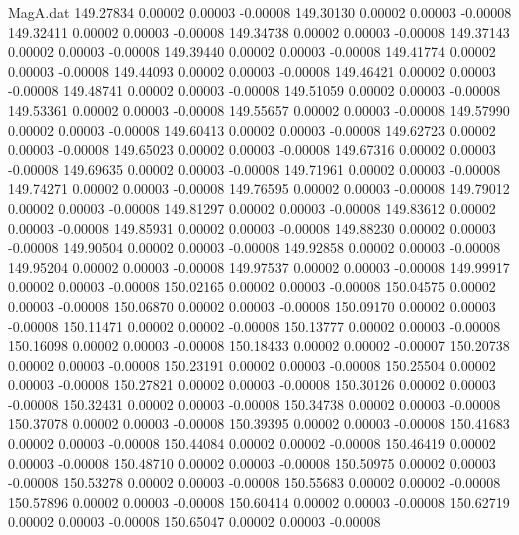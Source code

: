 \begin{filecontents}{MagA.dat}
 149.27834    0.00002    0.00003   -0.00008
 149.30130    0.00002    0.00003   -0.00008
 149.32411    0.00002    0.00003   -0.00008
 149.34738    0.00002    0.00003   -0.00008
 149.37143    0.00002    0.00003   -0.00008
 149.39440    0.00002    0.00003   -0.00008
 149.41774    0.00002    0.00003   -0.00008
 149.44093    0.00002    0.00003   -0.00008
 149.46421    0.00002    0.00003   -0.00008
 149.48741    0.00002    0.00003   -0.00008
 149.51059    0.00002    0.00003   -0.00008
 149.53361    0.00002    0.00003   -0.00008
 149.55657    0.00002    0.00003   -0.00008
 149.57990    0.00002    0.00003   -0.00008
 149.60413    0.00002    0.00003   -0.00008
 149.62723    0.00002    0.00003   -0.00008
 149.65023    0.00002    0.00003   -0.00008
 149.67316    0.00002    0.00003   -0.00008
 149.69635    0.00002    0.00003   -0.00008
 149.71961    0.00002    0.00003   -0.00008
 149.74271    0.00002    0.00003   -0.00008
 149.76595    0.00002    0.00003   -0.00008
 149.79012    0.00002    0.00003   -0.00008
 149.81297    0.00002    0.00003   -0.00008
 149.83612    0.00002    0.00003   -0.00008
 149.85931    0.00002    0.00003   -0.00008
 149.88230    0.00002    0.00003   -0.00008
 149.90504    0.00002    0.00003   -0.00008
 149.92858    0.00002    0.00003   -0.00008
 149.95204    0.00002    0.00003   -0.00008
 149.97537    0.00002    0.00003   -0.00008
 149.99917    0.00002    0.00003   -0.00008
 150.02165    0.00002    0.00003   -0.00008
 150.04575    0.00002    0.00003   -0.00008
 150.06870    0.00002    0.00003   -0.00008
 150.09170    0.00002    0.00003   -0.00008
 150.11471    0.00002    0.00002   -0.00008
 150.13777    0.00002    0.00003   -0.00008
 150.16098    0.00002    0.00003   -0.00008
 150.18433    0.00002    0.00002   -0.00007
 150.20738    0.00002    0.00003   -0.00008
 150.23191    0.00002    0.00003   -0.00008
 150.25504    0.00002    0.00003   -0.00008
 150.27821    0.00002    0.00003   -0.00008
 150.30126    0.00002    0.00003   -0.00008
 150.32431    0.00002    0.00003   -0.00008
 150.34738    0.00002    0.00003   -0.00008
 150.37078    0.00002    0.00003   -0.00008
 150.39395    0.00002    0.00003   -0.00008
 150.41683    0.00002    0.00003   -0.00008
 150.44084    0.00002    0.00002   -0.00008
 150.46419    0.00002    0.00003   -0.00008
 150.48710    0.00002    0.00003   -0.00008
 150.50975    0.00002    0.00003   -0.00008
 150.53278    0.00002    0.00003   -0.00008
 150.55683    0.00002    0.00002   -0.00008
 150.57896    0.00002    0.00003   -0.00008
 150.60414    0.00002    0.00003   -0.00008
 150.62719    0.00002    0.00003   -0.00008
 150.65047    0.00002    0.00003   -0.00008

\end{filecontents}
